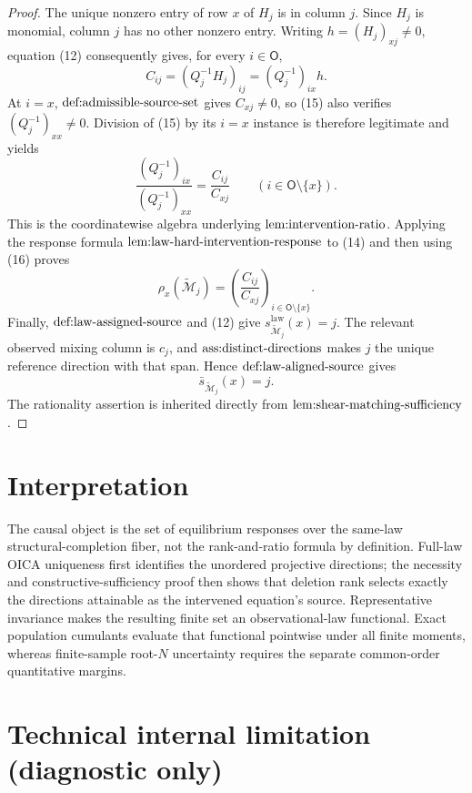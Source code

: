 \documentclass{article}
\begin{document}
\begin{proof}
The unique nonzero entry of row \(x\) of \(H_j\) is in column \(j\).  Since \(H_j\) is monomial, column \(j\) has no other nonzero entry.  Writing \(h=(H_j)_{xj}\ne0\), equation (12) consequently gives, for every \(i\in\mathsf O\),
\[
 C_{ij}=(Q_j^{-1}H_j)_{ij}=(Q_j^{-1})_{ix}h.                               \tag{15}
\]
At \(i=x\), \(\textnormal{def:admissible-source-set}\) gives \(C_{xj}\ne0\), so (15) also verifies \((Q_j^{-1})_{xx}\ne0\).  Division of (15) by its \(i=x\) instance is therefore legitimate and yields
\[
 \frac{(Q_j^{-1})_{ix}}{(Q_j^{-1})_{xx}}
 =\frac{C_{ij}}{C_{xj}}
 \qquad(i\in\mathsf O\setminus\{x\}).                                      \tag{16}
\]
This is the coordinatewise algebra underlying \(\textnormal{lem:intervention-ratio}\).  Applying the response formula \(\textnormal{lem:law-hard-intervention-response}\) to (14) and then using (16) proves
\[
 \rho_x(\widetilde{\mathcal M}_j)
 =\left(\frac{C_{ij}}{C_{xj}}\right)_{i\in\mathsf O\setminus\{x\}}.          \tag{17}
\]
Finally, \(\textnormal{def:law-assigned-source}\) and (12) give
\(s_{\widetilde{\mathcal M}_j}^{\mathrm{law}}(x)=j\).  The relevant observed mixing column is \(c_j\), and \(\textnormal{ass:distinct-directions}\) makes \(j\) the unique reference direction with that span.  Hence \(\textnormal{def:law-aligned-source}\) gives
\[
 \bar s_{\widetilde{\mathcal M}_j}(x)=j.
\]
The rationality assertion is inherited directly from \(\textnormal{lem:shear-matching-sufficiency}\).
\end{proof}

\section{Interpretation}

The causal object is the set of equilibrium responses over the same-law structural-completion fiber, not the rank-and-ratio formula by definition. Full-law OICA uniqueness first identifies the unordered projective directions; the necessity and constructive-sufficiency proof then shows that deletion rank selects exactly the directions attainable as the intervened equation's source. Representative invariance makes the resulting finite set an observational-law functional. Exact population cumulants evaluate that functional pointwise under all finite moments, whereas finite-sample root-\(N\) uncertainty requires the separate common-order quantitative margins.

\section*{Technical internal limitation (diagnostic only)}
\end{document}

